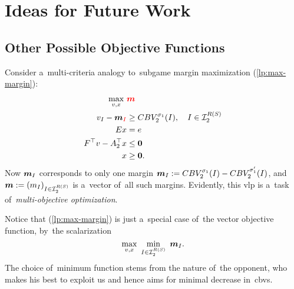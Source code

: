 \chapter{Ideas for Future Work}
\todo

\section{Other Possible Objective Functions}
Consider a~multi-criteria analogy to~subgame margin maximization (\ref{lp:max-margin}):
\begin{equation}
  \label{vlp:max-margins}
  \begin{split}
    \max_{v, x}\ &\textcolor{red}{\boldsymbol{m}} \\
    v_I - \boldsymbol{m}_{\textcolor{red}{I}} &\ge CBV_2^{\sigma_1}(I), \quad I \in \mathcal{I}_2^{R(S)}\\ 
    Ex &= e \\
    F^\top v - A_2^\top x &\le \boldsymbol{0} \\
    x &\ge \boldsymbol{0}.
  \end{split}
\end{equation}
Now $\boldsymbol{m}_I$ corresponds to only one margin $\boldsymbol{m}_I := CBV_2^{\sigma_1} (I) - CBV_2^{\sigma_1'} (I)$, and $\boldsymbol{m} := (m_I) _{I\in\mathcal{I}_2^{R(S)}}$ is a~vector of~all such margins.
Evidently, this \acrfull{vlp} is a~task of~\emph{multi-objective optimization}.

Notice that (\ref{lp:max-margin}) is just a~special case of~the vector objective function, by~the scalarization
\[
  \max_{v, x}\ \min_{I \in \I_2^{R(S)}}\ {\vect{m}_I}.
\]
The choice of~minimum function stems from the nature of~the opponent, who makes his best to exploit us and hence aims for minimal decrease in~\acrshort{cbv}s.

\todo
